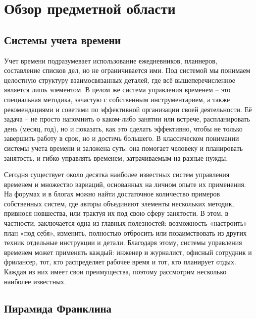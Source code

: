 \lstset{style=phpstyle}

\section{Обзор предметной области}
\label{sec:domain}

\subsection{Системы учета времени}
\label{sub:domain:time_managament_systems}
Учет времени подразумевает использование ежедневников, планнеров, составление списков дел, но не ограничивается ими. Под системой мы понимаем целостную структуру взаимосвязанных деталей, где всё вышеперечисленное является лишь элементом. В целом же система управления временем – это специальная методика, зачастую с собственным инструментарием, а также рекомендациями и советами по эффективной организации своей деятельности. Её задача – не просто напомнить о каком-либо занятии или встрече, распланировать день (месяц, год), но и показать, как это сделать эффективно, чтобы не только завершить работу в срок, но и достичь большего. В классическом понимании системы учета времени и заложена суть: она помогает человеку и планировать занятость, и гибко управлять временем, затрачиваемым на разные нужды.

Сегодня существует около десятка наиболее известных систем управления временем и множество вариаций, основанных на личном опыте их применения. На форумах и в блогах можно найти достаточное количество примеров собственных систем, где авторы объединяют элементы нескольких методик, привнося новшества, или трактуя их под свою сферу занятости. В этом, в частности, заключается одна из главных полезностей: возможность «настроить» план «под себя», изменить, полностью отбросить или позаимствовать из других техник отдельные инструкции и детали. Благодаря этому, системы управления временем может применять каждый: инженер и журналист, офисный сотрудник и фрилансер, тот, кто распределяет рабочее время и тот, кто планирует отдых. Каждая из них имеет свои преимущества, поэтому рассмотрим несколько наиболее известных.


\subsection{Пирамида Франклина}

